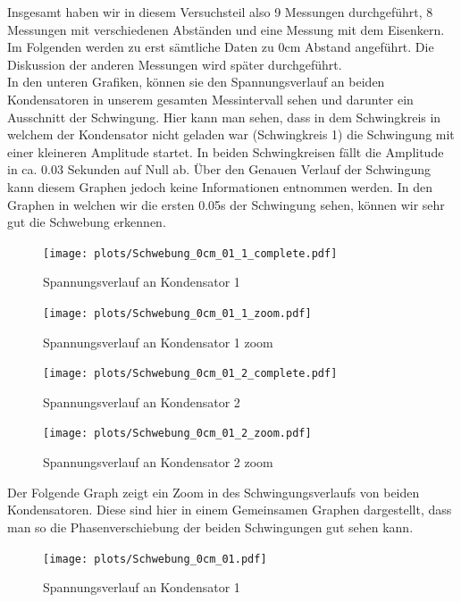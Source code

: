 \documentclass[twoside]{protokoll}
\begin{document}
Insgesamt haben wir in diesem Versuchsteil also 9 Messungen durchgeführt, 8 Messungen mit verschiedenen Abständen und eine Messung mit dem Eisenkern. 
Im Folgenden werden zu erst sämtliche Daten zu 0cm Abstand angeführt. Die Diskussion der anderen Messungen wird später durchgeführt.\\


In den unteren Grafiken, können sie den Spannungsverlauf an beiden Kondensatoren in unserem gesamten Messintervall sehen und darunter ein Ausschnitt der Schwingung. 
Hier kann man sehen, dass in dem Schwingkreis in welchem der Kondensator nicht geladen war (Schwingkreis 1) die Schwingung mit einer kleineren Amplitude startet. 
In beiden Schwingkreisen fällt die Amplitude in ca. 0.03 Sekunden auf Null ab.
Über den Genauen Verlauf der Schwingung kann diesem Graphen jedoch keine Informationen entnommen werden. 
In den Graphen in welchen wir die ersten 0.05s der Schwingung sehen, können wir sehr gut die Schwebung erkennen. 

\begin{figure}[H]
    \centering
    \texttt{[image: plots/Schwebung\_0cm\_01\_1\_complete.pdf]}
    \caption{Spannungsverlauf an Kondensator 1}
\end{figure}
\begin{figure}[H]
    \centering
    \texttt{[image: plots/Schwebung\_0cm\_01\_1\_zoom.pdf]}
    \caption{Spannungsverlauf an Kondensator 1 zoom}
\end{figure}


\begin{figure}[H]
    \centering
    \texttt{[image: plots/Schwebung\_0cm\_01\_2\_complete.pdf]}
    \caption{Spannungsverlauf an Kondensator 2}
\end{figure}
\begin{figure}[H]
    \centering
    \texttt{[image: plots/Schwebung\_0cm\_01\_2\_zoom.pdf]}
    \caption{Spannungsverlauf an Kondensator 2 zoom}
\end{figure}


Der Folgende Graph zeigt ein Zoom in des Schwingungsverlaufs von beiden Kondensatoren. Diese sind hier in einem Gemeinsamen Graphen dargestellt, dass man so die Phasenverschiebung der beiden Schwingungen gut sehen kann. 

\begin{figure}[H]
    \centering
    \texttt{[image: plots/Schwebung\_0cm\_01.pdf]}
    \caption{Spannungsverlauf an Kondensator 1}
    \label{Schwebung}
\end{figure}
\end{document}
